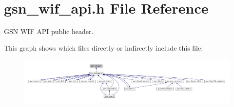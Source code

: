 \hypertarget{a00606}{
\section{gsn\_\-wif\_\-api.h File Reference}
\label{a00606}
}


GSN WIF API public header.  


This graph shows which files directly or indirectly include this file:
\nopagebreak
\begin{figure}[H]
\begin{center}
\leavevmode
\includegraphics[width=400pt]{a00853}
\end{center}
\end{figure}
